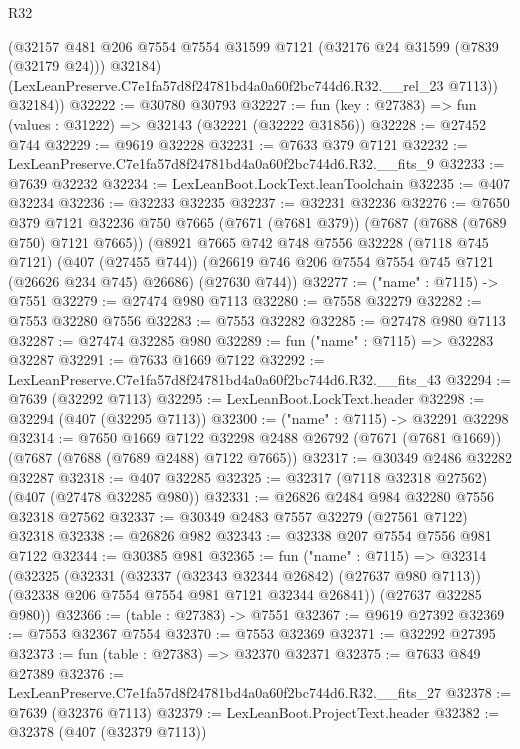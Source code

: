 \begin{lexlean}{R32}
\begin{coremodule}
          (@32157
            @481
            @206
            @7554
            @7554
            @31599
            @7121
            (@32176 @24 @31599 (@7839 (@32179 @24)))
            @32184)
          (LexLeanPreserve.C7e1fa57d8f24781bd4a0a60f2bc744d6.R32.__rel_23 @7113))
        @32184))
@32222 := @30780 @30793
@32227 := fun (key : @27383) => fun (values : @31222) => @32143 (@32221 (@32222 @31856))
@32228 := @27452 @744
@32229 := @9619 @32228
@32231 := @7633 @379 @7121
@32232 := LexLeanPreserve.C7e1fa57d8f24781bd4a0a60f2bc744d6.R32.__fits_9
@32233 := @7639 @32232
@32234 := LexLeanBoot.LockText.leanToolchain
@32235 := @407 @32234
@32236 := @32233 @32235
@32237 := @32231 @32236
@32276 := @7650
    @379
    @7121
    @32236
    @750
    @7665
    (@7671 (@7681 @379))
    (@7687 (@7688 (@7689 @750) @7121 @7665))
    (@8921
      @7665
      @742
      @748
      @7556
      @32228
      (@7118 @745 @7121)
      (@407 (@27455 @744))
      (@26619 @746 @206 @7554 @7554 @745 @7121 (@26626 @234 @745) @26686)
      (@27630 @744))
@32277 := ("name" : @7115) -> @7551
@32279 := @27474 @980 @7113
@32280 := @7558 @32279
@32282 := @7553 @32280 @7556
@32283 := @7553 @32282
@32285 := @27478 @980 @7113
@32287 := @27474 @32285 @980
@32289 := fun ("name" : @7115) => @32283 @32287
@32291 := @7633 @1669 @7122
@32292 := LexLeanPreserve.C7e1fa57d8f24781bd4a0a60f2bc744d6.R32.__fits_43
@32294 := @7639 (@32292 @7113)
@32295 := LexLeanBoot.LockText.header
@32298 := @32294 (@407 (@32295 @7113))
@32300 := ("name" : @7115) -> @32291 @32298
@32314 := @7650
    @1669
    @7122
    @32298
    @2488
    @26792
    (@7671 (@7681 @1669))
    (@7687 (@7688 (@7689 @2488) @7122 @7665))
@32317 := @30349 @2486 @32282 @32287
@32318 := @407 @32285
@32325 := @32317 (@7118 @32318 @27562) (@407 (@27478 @32285 @980))
@32331 := @26826 @2484 @984 @32280 @7556 @32318 @27562
@32337 := @30349 @2483 @7557 @32279 (@27561 @7122) @32318
@32338 := @26826 @982
@32343 := @32338 @207 @7554 @7556 @981 @7122
@32344 := @30385 @981
@32365 := fun ("name" : @7115) =>
  @32314
    (@32325
      (@32331
        (@32337 (@32343 @32344 @26842) (@27637 @980 @7113))
        (@32338 @206 @7554 @7554 @981 @7121 @32344 @26841))
      (@27637 @32285 @980))
@32366 := (table : @27383) -> @7551
@32367 := @9619 @27392
@32369 := @7553 @32367 @7554
@32370 := @7553 @32369
@32371 := @32292 @27395
@32373 := fun (table : @27383) => @32370 @32371
@32375 := @7633 @849 @27389
@32376 := LexLeanPreserve.C7e1fa57d8f24781bd4a0a60f2bc744d6.R32.__fits_27
@32378 := @7639 (@32376 @7113)
@32379 := LexLeanBoot.ProjectText.header
@32382 := @32378 (@407 (@32379 @7113))

\end{coremodule}
\end{lexlean}
